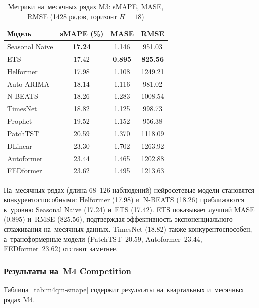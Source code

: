 \begin{table}[H]
\centering
\caption{Метрики на~месячных рядах M3: sMAPE, MASE, RMSE (1428 рядов, горизонт $H{=}18$)}
\label{tab:m3-monthly-detail}
\small
\begin{tabular}{@{}lccc@{}}
\toprule
Модель & sMAPE (\%) & MASE & RMSE \\
\midrule
Seasonal Naive & \textbf{17.24} & 1.146 & 951.03 \\
ETS            & 17.42 & \textbf{0.895} & \textbf{825.56} \\
Helformer      & 17.98 & 1.108 & 1249.21 \\
Auto-ARIMA     & 18.14 & 1.116 & 981.02 \\
N-BEATS        & 18.26 & 1.283 & 1008.54 \\
TimesNet       & 18.82 & 1.125 & 998.73 \\
Prophet        & 19.52 & 1.152 & 956.38 \\
PatchTST       & 20.59 & 1.370 & 1118.09 \\
DLinear        & 23.30 & 1.702 & 1263.92 \\
Autoformer     & 23.44 & 1.465 & 1202.88 \\
FEDformer      & 23.62 & 1.495 & 1213.63 \\
\bottomrule
\end{tabular}
\end{table}

На~месячных рядах (длина 68--126 наблюдений) нейросетевые модели
становятся конкурентоспособными: Helformer (17.98) и~N-BEATS (18.26)
приближаются к~уровню Seasonal Naive (17.24) и~ETS (17.42).
ETS показывает лучший MASE (0.895) и~RMSE (825.56), подтверждая
эффективность экспоненциального сглаживания на~месячных данных.
TimesNet (18.82) также конкурентоспособен, а~трансформерные модели
(PatchTST~20.59, Autoformer~23.44, FEDformer~23.62) отстают заметнее.

\subsubsection{Результаты на~M4 Competition}
\label{sssec:m4-results}

Таблица~\ref{tab:m4qm-smape} содержит результаты на~квартальных
и~месячных рядах M4.

